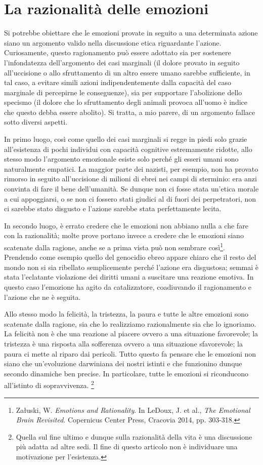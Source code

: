 \section{La razionalità delle emozioni}

Si potrebbe obiettare che le emozioni provate in seguito a una determinata azione siano un argomento
valido nella discussione etica riguardante l'azione. Curiosamente, questo ragionamento può essere
adottato sia per sostenere l'infondatezza dell'argomento dei casi marginali (il dolore provato in
seguito all'uccisione o allo sfruttamento di un altro essere umano sarebbe sufficiente, in tal caso,
a evitare simili azioni indipendentemente dalla capacità del caso marginale di percepirne le
conseguenze), sia per supportare l'abolizione dello specismo (il dolore che lo sfruttamento degli
animali provoca all'uomo è indice che questo debba essere abolito). Si tratta, a mio parere, di un
argomento fallace sotto diversi aspetti.

In primo luogo, così come quello dei casi marginali si regge in piedi solo grazie all'esistenza di
pochi individui con capacità cognitive estremamente ridotte, allo stesso modo l'argomento emozionale
esiste solo perché gli esseri umani sono naturalmente empatici. La maggior parte dei nazisti, per
esempio, non ha provato rimorso in seguito all'uccisione di milioni di ebrei nei campi di sterminio:
era anzi convinta di fare il bene dell'umanità. Se dunque non ci fosse stata un'etica morale a cui
appoggiarsi, o se non ci fossero stati giudici al di fuori dei perpetratori, non ci sarebbe stato
disgusto e l'azione sarebbe stata perfettamente lecita.

In secondo luogo, è errato credere che le emozioni non abbiano nulla a che fare con la razionalità;
molte prove portano invece a credere che le emozioni siano scatenate dalla ragione, anche se a prima
vista può non sembrare così\footnote{Załuski, W. \emph{Emotions and Rationality}. In LeDoux, J. et
al., \emph{The Emotional Brain Revisited}. Copernicus Center Press, Cracovia 2014, pp. 303-318.}.
Prendendo come esempio quello del genocidio ebreo appare chiaro che il resto del mondo non si sia
ribellato semplicemente perché l'azione era disgustosa; semmai è stata l'eclatante violazione dei
diritti umani a suscitare una reazione emotiva. In questo caso l'emozione ha agito da catalizzatore,
coadiuvando il ragionamento e l'azione che ne è seguita.

Allo stesso modo la felicità, la tristezza, la paura e tutte le altre emozioni sono scatenate dalla
ragione, sia che lo realizziamo razionalmente sia che lo ignoriamo. La felicità non è che una
reazione al piacere ovvero a una situazione favorevole; la tristezza è una risposta alla sofferenza
ovvero a una situazione sfavorevole; la paura ci mette al riparo dai pericoli. Tutto questo fa
pensare che le emozioni non siano che un'evoluzione darwiniana dei nostri istinti e che funzionino
dunque secondo dinamiche ben precise. In particolare, tutte le emozioni si riconducono all'istinto
di sopravvivenza. \footnote{Quella sul fine ultimo e dunque sulla razionalità della vita è una
discussione più adatta ad altre sedi. Il fine di questo articolo non è individuare una motivazione
per l'esistenza.}

